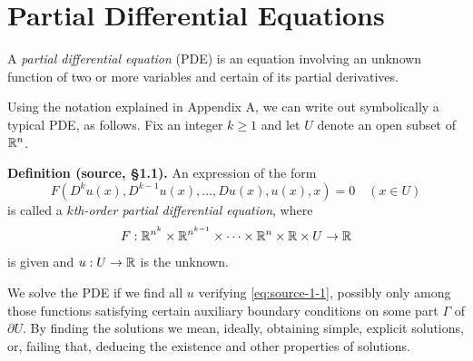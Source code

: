\section{Partial Differential Equations}
\label{sec:1-1}

A \emph{partial differential equation} (PDE) is an equation involving an unknown
function of two or more variables and certain of its partial derivatives.

Using the notation explained in Appendix A, we can write out symbolically
a typical PDE, as follows. Fix an integer $k\geq1$ and let $U$ denote an open
subset of $\mathbb{R}^n$.
\par\Needspace{65mm}

\noindent\textbf{Definition (source, \S1.1).}
An expression of the form
\begingroup
\renewcommand{\theequation}{\arabic{equation}}
\begin{equation}
 F(D^ku(x),D^{k-1}u(x),\ldots,Du(x),u(x),x)=0
 \quad (x\in U)
 \label{eq:source-1-1}
\end{equation}
\endgroup
is called a \emph{$k$th-order partial differential equation}, where
\[
 F:\mathbb{R}^{n^k}\times\mathbb{R}^{n^{k-1}}\times\cdots\times\mathbb{R}^n\times\mathbb{R}\times U\to\mathbb{R}
\]
is given and $u:U\to\mathbb{R}$ is the unknown.

We solve the PDE if we find all $u$ verifying \eqref{eq:source-1-1}, possibly
only among those functions satisfying certain auxiliary boundary conditions
on some part $\Gamma$ of $\partial U$. By finding the solutions we mean,
ideally, obtaining simple, explicit solutions, or, failing that, deducing the
existence and other properties of solutions.

